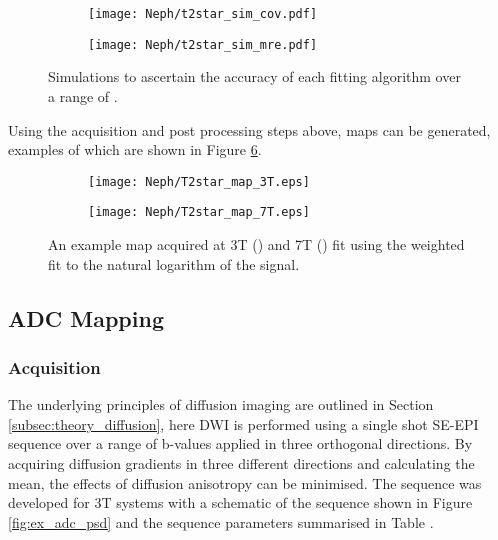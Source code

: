 \begin{figure}[H]
	\centering
	\begin{subfigure}[c]{0.47\textwidth}
		\centering
		\texttt{[image: Neph/t2star\_sim\_cov.pdf]}
		\caption{}
		\label{fig:ex_t2star_sim_cov}
	\end{subfigure}
	\hfill
	\begin{subfigure}[c]{0.47\textwidth}
		\centering
		\texttt{[image: Neph/t2star\_sim\_mre.pdf]}
		\caption{}
		\label{fig:ex_t2star_sim_mre}
	\end{subfigure}
	\caption{Simulations to ascertain the accuracy of each \ttwostar fitting algorithm over a range of \ttwostar.}
	\label{fig:ex_t2star_sim}
\end{figure}

Using the acquisition and post processing steps above, \ttwostar maps can be generated, examples of which are shown in Figure \ref{fig:ex_t2star_maps}.

\begin{figure}[H]
	\centering
	\begin{subfigure}[c]{0.47\textwidth}
		\centering
		\texttt{[image: Neph/T2star\_map\_3T.eps]}
		\caption{}
		\label{fig:ex_t2star_map_3t}
	\end{subfigure}
	\hfill
	\begin{subfigure}[c]{0.47\textwidth}
		\centering
		\texttt{[image: Neph/T2star\_map\_7T.eps]}
		\caption{}
		\label{fig:ex_t2star_map_7t}
	\end{subfigure}
	\caption{An example \ttwostar map acquired at 3T () and 7T () fit using the weighted fit to the natural logarithm of the signal.}
	\label{fig:ex_t2star_maps}
\end{figure}

\subsection{\acl*{ADC} Mapping}
\subsubsection{Acquisition}
The underlying principles of diffusion imaging are outlined in Section \ref{subsec:theory_diffusion}, here \ac{DWI} is performed using a single shot \ac{SE}-\ac{EPI} sequence over a range of b-values applied in three orthogonal directions. By acquiring diffusion gradients in three different directions and calculating the mean, the effects of diffusion anisotropy can be minimised. The sequence was developed for 3T systems with a schematic of the sequence shown in Figure \ref{fig:ex_adc_psd} and the sequence parameters summarised in Table . 

